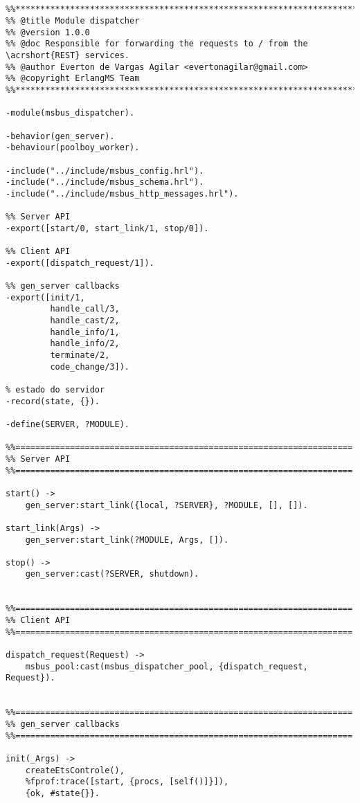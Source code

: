 \begin{lstlisting} 


%%************************************************************************
%% @title Module dispatcher
%% @version 1.0.0
%% @doc Responsible for forwarding the requests to / from the \acrshort{REST} services.
%% @author Everton de Vargas Agilar <evertonagilar@gmail.com>
%% @copyright ErlangMS Team
%%************************************************************************

-module(msbus_dispatcher).

-behavior(gen_server). 
-behaviour(poolboy_worker).

-include("../include/msbus_config.hrl").
-include("../include/msbus_schema.hrl").
-include("../include/msbus_http_messages.hrl").

%% Server API
-export([start/0, start_link/1, stop/0]).

%% Client API
-export([dispatch_request/1]).

%% gen_server callbacks
-export([init/1, 
	     handle_call/3, 
	     handle_cast/2, 
	     handle_info/1, 
	     handle_info/2, 
	     terminate/2, 
	     code_change/3]).

% estado do servidor
-record(state, {}).

-define(SERVER, ?MODULE).

%%====================================================================
%% Server API
%%====================================================================

start() -> 
    gen_server:start_link({local, ?SERVER}, ?MODULE, [], []).
 
start_link(Args) ->
    gen_server:start_link(?MODULE, Args, []).

stop() ->
    gen_server:cast(?SERVER, shutdown).
 

%%====================================================================
%% Client API
%%====================================================================

dispatch_request(Request) -> 
	msbus_pool:cast(msbus_dispatcher_pool, {dispatch_request, Request}).

 
%%====================================================================
%% gen_server callbacks
%%====================================================================
 
init(_Args) ->
    createEtsControle(),
    %fprof:trace([start, {procs, [self()]}]),
    {ok, #state{}}.
 

\end{lstlisting}
